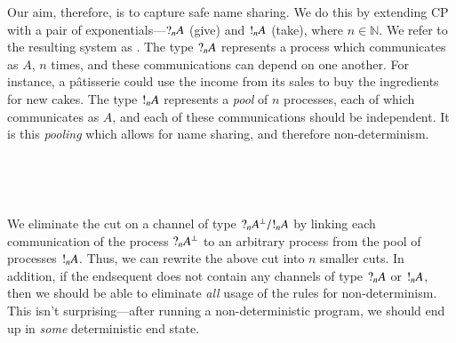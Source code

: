 \documentclass[twocolumn]{article}
\begin{document}
Our aim, therefore, is to capture safe name sharing.
We do this by extending CP with a pair of exponentials---$\give[n]{A}$ (give)
and $\take[n]{A}$ (take), where $n \in \mathbb{N}$.
We refer to the resulting system as \gtcp.
The type $\give[n]{A}$ represents a process which communicates as $A$, $n$
times, and these communications can depend on one another.
For instance, a p\^{a}tisserie could use the income from its sales to buy the
ingredients for new cakes.
The type $\take[n]{A}$ represents a \emph{pool} of $n$ processes, each of which
communicates as $A$, and each of these communications should be independent.
It is this \emph{pooling} which allows for name sharing, and therefore
non-determinism.
\begin{center}
  \begin{proofbox}
    \SYM{\give{}}
  \end{proofbox}
  \begin{proofbox}
    \SYM{\take{}}
  \end{proofbox}
  \\[1\baselineskip]
  \begin{proofbox}
  \end{proofbox}
  \\[1\baselineskip]
  \begin{proofbox}
  \end{proofbox}
\end{center}
We eliminate the cut on a channel of type $\give[n]{A^\bot} / \take[n]{A}$
by linking each communication of the process $\give[n]{A^\bot}$ to an arbitrary
process from the pool of processes $\take[n]{A}$. 
Thus, we can rewrite the above cut into $n$ smaller cuts.
In addition, if the endsequent does not contain any channels of type
$\give[n]{A}$ or $\take[n]{A}$, then we should be able to eliminate \emph{all}
usage of the rules for non-determinism. This isn't surprising---after running a
non-deterministic program, we should end up in \emph{some} deterministic end
state.
\end{document}
